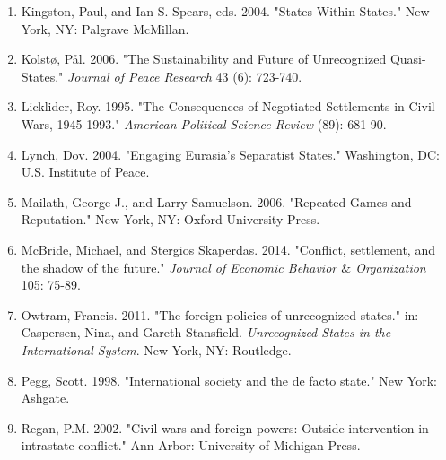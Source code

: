 \documentclass[11pt,letterpaper, notitlepage]{article}
\begin{document}
\begin{enumerate}[1.]
\item \hangindent=1cm Kingston, Paul, and Ian S. Spears, eds. 2004. "States-Within-States." New York, NY: Palgrave McMillan.

\item \hangindent=1cm Kolst\o, P{\aa}l. 2006. "The Sustainability and Future of Unrecognized Quasi-States." \emph {Journal of Peace Research} 43 (6): 723-740.

\item \hangindent=1cm Licklider, Roy. 1995. "The Consequences of Negotiated Settlements in Civil Wars, 1945-1993." \emph {American Political Science Review} (89): 681-90.


\item \hangindent=1cm Lynch, Dov. 2004. "Engaging Eurasia's Separatist States." Washington, DC: U.S. Institute of Peace.

\item \hangindent=1cm Mailath, George J., and Larry Samuelson. 2006. "Repeated Games and Reputation." New York, NY: Oxford University Press.

\item \hangindent=1cm McBride, Michael, and Stergios Skaperdas. 2014. "Conflict, settlement, and the shadow of the future." \emph{Journal of Economic Behavior $\&$ Organization} 105: 75-89.

\item \hangindent=1cm Owtram, Francis. 2011. "The foreign policies of unrecognized states." in: Caspersen, Nina, and Gareth Stansfield. \emph{Unrecognized States in the International System}. New York, NY: Routledge. 

\item \hangindent=1cm Pegg, Scott. 1998. "International society and the de facto state." New York: Ashgate.



\item \hangindent=1cm Regan, P.M. 2002. "Civil wars and foreign powers: Outside intervention in intrastate conflict." Ann Arbor: University of Michigan Press.


\end{enumerate}
\end{document}
